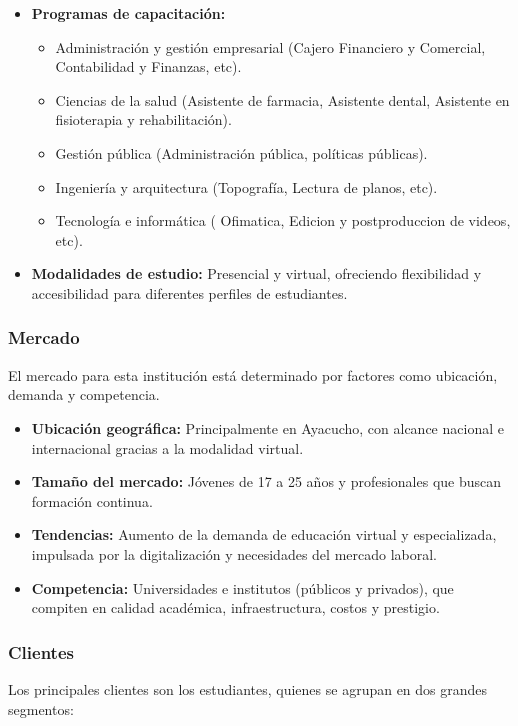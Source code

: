 \begin{itemize}
	\item \textbf{Programas de capacitación:}
	
	\begin{itemize}
		\item Administración y gestión empresarial (Cajero Financiero y Comercial, Contabilidad y Finanzas, etc).
		\item Ciencias de la salud (Asistente de farmacia, Asistente dental, Asistente en fisioterapia y rehabilitación).
		\item Gestión pública (Administración pública, políticas públicas).
		\item Ingeniería y arquitectura (Topografía, Lectura de planos, etc).
		\item Tecnología e informática ( Ofimatica, Edicion y postproduccion de videos, etc).
	\end{itemize}
	
	
	\item \textbf{Modalidades de estudio:} Presencial y virtual, ofreciendo flexibilidad y accesibilidad para diferentes perfiles de estudiantes.
\end{itemize}

\subsubsection{Mercado}
El mercado para esta institución está determinado por factores como ubicación, demanda y competencia.

\begin{itemize}
	\item \textbf{Ubicación geográfica:} Principalmente en Ayacucho, con alcance nacional e internacional gracias a la modalidad virtual.
	\item \textbf{Tamaño del mercado:} Jóvenes de 17 a 25 años y profesionales que buscan formación continua.
	\item \textbf{Tendencias:} Aumento de la demanda de educación virtual y especializada, impulsada por la digitalización y necesidades del mercado laboral.
	\item \textbf{Competencia:} Universidades e institutos (públicos y privados), que compiten en calidad académica, infraestructura, costos y prestigio.
\end{itemize}

\subsubsection{Clientes}
Los principales clientes son los estudiantes, quienes se agrupan en dos grandes segmentos:

